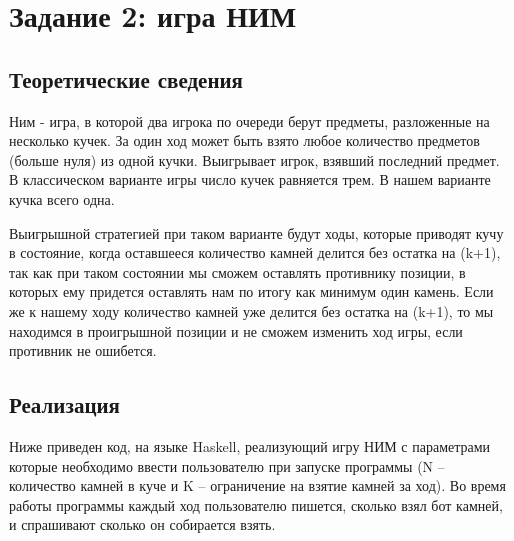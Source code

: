 \documentclass[10pt,a4paper,final]{article} %
\begin{document}
\newpage
\section{Задание 2: игра НИМ}
\subsection {Теоретические сведения}

Ним - игра, в которой два игрока по очереди берут предметы, разложенные на несколько кучек. За один ход может быть взято любое количество предметов (больше нуля) из одной кучки. Выигрывает игрок, взявший последний предмет. В классическом варианте игры число кучек равняется трем. В нашем варианте кучка всего одна.

Выигрышной стратегией при таком варианте будут ходы, которые приводят кучу в состояние, когда оставшееся количество камней делится без остатка на (k+1), так как при таком состоянии мы сможем оставлять противнику позиции, в которых ему придется оставлять нам по итогу как минимум один камень. Если же к нашему ходу количество камней уже делится без остатка на (k+1), то мы находимся в проигрышной позиции и не сможем изменить ход игры, если противник не ошибется.

\subsection{Реализация}

Ниже приведен код, на языке Haskell, реализующий игру НИМ с параметрами которые необходимо ввести пользователю при запуске программы (N -- количество камней в куче и K -- ограничение на взятие камней за ход). Во время работы программы каждый ход пользователю пишется, сколько взял бот камней, и спрашивают сколько он собирается взять.
\end{document}
